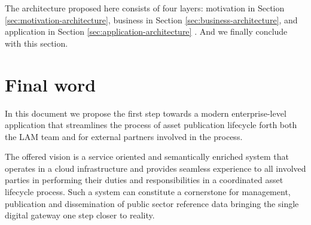 	The architecture proposed here consists of four layers: motivation in Section \ref{sec:motivation-architecture}, business in Section \ref{sec:business-architecture}, and application in Section \ref{sec:application-architecture} . And we finally conclude with this section.
	
    \section{Final word}
    In this document we propose the first step towards a modern enterprise-level application that streamlines the process of asset publication lifecycle forth both the LAM team and for external partners involved in the process. 
    
    The offered vision is a service oriented and semantically enriched system that operates in a cloud infrastructure and provides seamless experience to all involved parties in performing their duties and responsibilities in a  coordinated asset lifecycle process. Such a system can constitute a cornerstone for management, publication and dissemination of public sector reference data bringing the single digital gateway one step closer to reality.